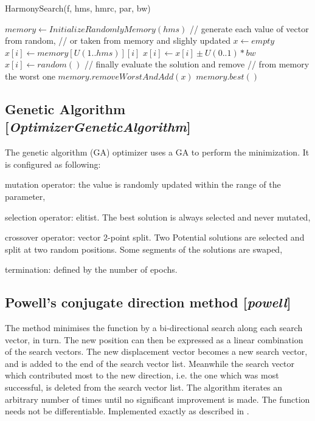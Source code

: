 \documentclass[11pt]{article}
\newcommand{\nllref}[1]{[\small{\textit{#1}}]}
\begin{document}
\begin{algorithm}
\caption{HarmonySearch(f, hms, hmrc, par, bw)}
\begin{algorithmic}
\STATE $memory \leftarrow InitializeRandomlyMemory(hms)$
\STATE // generate each value of vector from random,
\STATE // or taken from memory and slighly updated
\STATE $x \leftarrow empty$
\STATE $x[i] \leftarrow memory[U(1..hms)][i]$
\STATE $x[i] \leftarrow x[i] \pm U(0..1) * bw$
\ENDIF
\ELSE
\STATE $x[i] \leftarrow random()$
\ENDIF
\ENDFOR
\STATE // finally evaluate the solution and remove
\STATE // from memory the worst one
\STATE $memory.removeWorstAndAdd(x)$
\ENDIF
\ENDWHILE
\RETURN $memory.best()$

\end{algorithmic}
\end{algorithm}

\FloatBarrier

\subsection{Genetic Algorithm \nllref{OptimizerGeneticAlgorithm}}
The genetic algorithm (GA) optimizer uses a GA to perform the minimization. It is configured as following:
\begin{compactitem}
\item mutation operator: the value is randomly updated within the range of the parameter,
\item selection operator: elitist. The best solution is always selected and never mutated,
\item crossover operator: vector 2-point split. Two Potential solutions are selected and split at two random positions. Some segments of the solutions are swaped,
\item termination: defined by the number of epochs.
\end{compactitem}

\subsection{Powell's conjugate direction method \nllref{powell}}
The method minimises the function by a bi-directional search along each search vector, in turn. The new position can then be expressed as a linear combination of the search vectors. The new displacement vector becomes a new search vector, and is added to the end of the search vector list. Meanwhile the search vector which contributed most to the new direction, i.e. the one which was most successful, is deleted from the search vector list. The algorithm iterates an arbitrary number of times until no significant improvement is made. The function needs not be differentiable. Implemented exactly as described in \cite{NumericalRecipes}.
\end{document}
